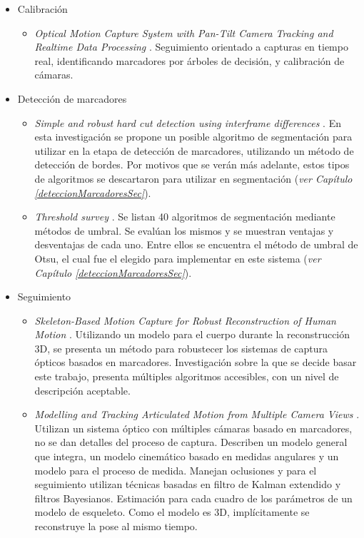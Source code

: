\begin{itemize}
	\item Calibración
	\begin{itemize}
		\item \emph{Optical Motion Capture System with Pan-Tilt Camera Tracking and Realtime Data Processing} \cite{kurihara2002optical}. Seguimiento orientado a capturas en tiempo real, identificando marcadores por árboles de decisión, y calibración de cámaras.
	\end{itemize}
	\item Detección de marcadores
	\begin{itemize}
		\item \emph{Simple and robust hard cut detection using interframe differences} \cite{pardo2005simple}. En esta investigación se propone un posible algoritmo de segmentación para utilizar en la etapa de detección de marcadores, utilizando un método de detección de bordes. Por motivos que se verán más adelante, estos tipos de algoritmos se descartaron para utilizar en segmentación (\textit{ver Capítulo \ref{deteccionMarcadoresSec}}).
		\item \emph{Threshold survey} \cite{surveyThreshold}. Se listan 40 algoritmos de segmentación mediante métodos de umbral. Se evalúan los mismos y se muestran ventajas y desventajas de cada uno. Entre ellos se encuentra el método de umbral de Otsu\cite{otsu}, el cual fue el elegido para implementar en este sistema (\textit{ver Capítulo \ref{deteccionMarcadoresSec}}).
	\end{itemize}
	\item Seguimiento
	\begin{itemize}
		\item \emph{Skeleton-Based Motion Capture for Robust Reconstruction of Human Motion} \cite{herda}. Utilizando un modelo para el cuerpo durante la reconstrucción 3D, se presenta un método para robustecer los sistemas de captura ópticos basados en marcadores. Investigación sobre la que se decide basar este trabajo, presenta múltiples algoritmos accesibles, con un nivel de descripción aceptable.
		\item \emph{Modelling and Tracking Articulated Motion from Multiple Camera Views} \cite{ringer2000modelling}.
		Utilizan un sistema óptico con múltiples cámaras basado en marcadores, no se dan detalles del proceso de captura. Describen un modelo general que integra, un modelo cinemático basado en medidas angulares y un modelo para el proceso de medida. Manejan oclusiones y para el seguimiento utilizan técnicas basadas en filtro de Kalman extendido y filtros Bayesianos. Estimación para cada cuadro de los parámetros de un modelo de esqueleto. Como el modelo es 3D, implícitamente se reconstruye la pose al mismo tiempo.  		

\end{itemize}
\end{itemize}
